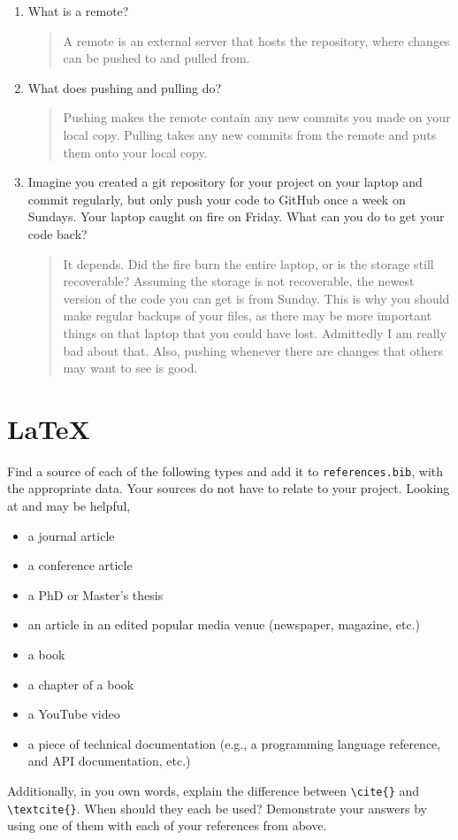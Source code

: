 \documentclass[10pt,twocolumn]{article}
\begin{document}
\begin{enumerate}
\item What is a remote?
    \begin{quote}
        A remote is an external server that hosts the repository, where changes
        can be pushed to and pulled from.
    \end{quote}
\item What does pushing and pulling do?
    \begin{quote}
        Pushing makes the remote contain any new commits
        you made on your local copy. Pulling takes any new commits from the
        remote and puts them onto your local copy.
    \end{quote}
\item Imagine you created a git repository for your project on your laptop and commit regularly, but only push your code to GitHub once a week on Sundays. Your laptop caught on fire on Friday. What can you do to get your code back?
    \begin{quote}
        It depends. Did the fire burn the entire laptop, or is the storage still
        recoverable? Assuming the storage is not recoverable, the newest version
        of the code you can get is from Sunday. This is why you should make
        regular backups of your files, as there may be more important things on
        that laptop that you could have lost. Admittedly I am really bad about
        that. Also, pushing whenever there are changes that others may want to
        see is good.
    \end{quote}
\end{enumerate}

\section{\LaTeX}

Find a source of each of the following types and add it to \texttt{references.bib}, with the appropriate data. Your sources do not have to relate to your project. Looking at \textcite{OverleafBibliographyManagement} and \textcite{WikipediaBibtex} may be helpful,

\begin{itemize}
\item a journal article
\item a conference article
\item a PhD or Master's thesis
\item an article in an edited popular media venue (newspaper, magazine, etc.)
\item a book
\item a chapter of a book
\item a YouTube video
\item a piece of technical documentation (e.g., a programming language reference, and API documentation, etc.)
\end{itemize}

Additionally, in you own words, explain the difference between \texttt{{\textbackslash}cite\{\}} and \texttt{{\textbackslash}textcite\{\}}. When should they each be used? Demonstrate your answers by using one of them with each of your references from above.

\printbibliography
\end{document}
